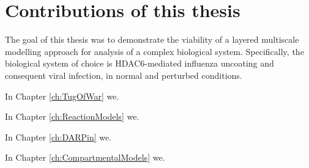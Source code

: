 \section{Contributions of this thesis}

The goal of this thesis was to demonstrate the viability of a layered multiscale modelling approach for analysis of a complex biological system. Specifically, the biological system of choice is HDAC6-mediated influenza uncoating and consequent viral infection, in normal and perturbed conditions.

In Chapter \ref{ch:TugOfWar} we.

In Chapter \ref{ch:ReactionModels} we.

In Chapter \ref{ch:DARPin} we.

In Chapter \ref{ch:CompartmentalModels} we.